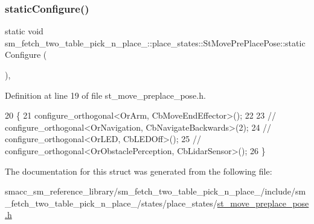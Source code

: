 \subsubsection{\texorpdfstring{static\+Configure()}{staticConfigure()}}
{\footnotesize\ttfamily static void sm\+\_\+fetch\+\_\+two\+\_\+table\+\_\+pick\+\_\+n\+\_\+place\+\_\+::place\+\_\+states\+::\+St\+Move\+Pre\+Place\+Pose\+::static\+Configure (\begin{DoxyParamCaption}{ }\end{DoxyParamCaption})\hspace{0.3cm}{\ttfamily [inline]}, {\ttfamily [static]}}



Definition at line 19 of file st\+\_\+move\+\_\+preplace\+\_\+pose.\+h.


\begin{DoxyCode}
20     \{
21         configure\_orthogonal<OrArm, CbMoveEndEffector>();
22 
23         \textcolor{comment}{//   configure\_orthogonal<OrNavigation, CbNavigateBackwards>(2);}
24         \textcolor{comment}{//   configure\_orthogonal<OrLED, CbLEDOff>();}
25         \textcolor{comment}{//   configure\_orthogonal<OrObstaclePerception, CbLidarSensor>();}
26     \}
\end{DoxyCode}


The documentation for this struct was generated from the following file\+:\begin{DoxyCompactItemize}
\item 
smacc\+\_\+sm\+\_\+reference\+\_\+library/sm\+\_\+fetch\+\_\+two\+\_\+table\+\_\+pick\+\_\+n\+\_\+place\+\_/include/sm\+\_\+fetch\+\_\+two\+\_\+table\+\_\+pick\+\_\+n\+\_\+place\+\_/states/place\+\_\+states/\hyperlink{sm__fetch__two__table__pick__n__place__1_2include_2sm__fetch__two__table__pick__n__place__1_2staba37cfbd4f0301ddae69b970e4a4478d}{st\+\_\+move\+\_\+preplace\+\_\+pose.\+h}\end{DoxyCompactItemize}
